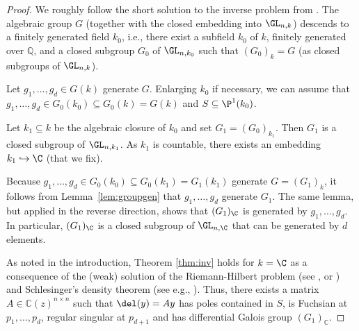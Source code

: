 \documentclass[a4paper, 11pt]{article}
\begin{document}
\begin{proof}
	 We roughly follow the short solution to the inverse problem from \cite[Section 5.2]{fengwib}. The algebraic group $G$ (together with the closed embedding into $\GL_{n,k}$) descends to a finitely generated field $k_0$, i.e., there exist a subfield $k_0$ of $k$, finitely generated over $\mathbb{Q}$, and a closed subgroup $G_0$ of $\GL_{n,k_0}$ such that $(G_0)_k=G$ (as closed subgroups of $\GL_{n,k}$).
	 
	 Let $g_1,\ldots,g_d\in G(k)$ generate $G$. Enlarging $k_0$ if necessary, we can assume that $g_1,\ldots,g_d\in G_0(k_0)\subseteq G_0(k)=G(k)$ and $S\subseteq \P^1(k_0)$.
	 
	 
	 
	 Let $k_1\subseteq k$ be the algebraic closure of $k_0$ and set $G_1=(G_0)_{k_1}$. Then $G_1$ is a closed subgroup of $\GL_{n,k_1}$. %
	 As $k_1$ is countable, there exists an embedding $k_1\hookrightarrow \C$ (that we fix).
	 
	 Because $g_1,\ldots,g_d\in G_0(k_0)\subseteq G_0(k_1)=G_1(k_1)$ generate $G=(G_1)_k$, it follows from Lemma~\ref{lem:groupgen} that $g_1,\ldots,g_d$ generate $G_1$. The same lemma, but applied in the reverse direction, shows that $(G_1)_{\C}$ is generated by $g_1,\ldots,g_d$. In particular, $(G_1)_{\C}$ is a closed subgroup of $\GL_{n,\C}$ that can be generated by $d$ elements.
	 
	 As noted in the introduction, Theorem \ref{thm:inv} holds for $k=\C$ as a consequence of the (weak) solution of the Riemann-Hilbert problem (see \cite[Theorem 3.2.1]{AnasovBolibruch:TheRiemannHilbertProblem}, \cite[Theorem 12.4]{Saul} or \cite[Part I, Theorem 4.49]{MitschiSauzin}) and Schlesinger's density theorem (see e.g., \cite[Part I, Theorem 2.28]{MitschiSauzin}).
	 Thus, there exists a matrix $A\in \mathbb{C}(z)^{n\times n}$ such that $\del(y)=Ay$ has poles contained in $S$, is Fuchsian at $p_1,\ldots,p_d$, regular singular at $p_{d+1}$ and has differential Galois group $(G_1)_{\mathbb{C}}$. 
	 

\end{proof}
\end{document}
